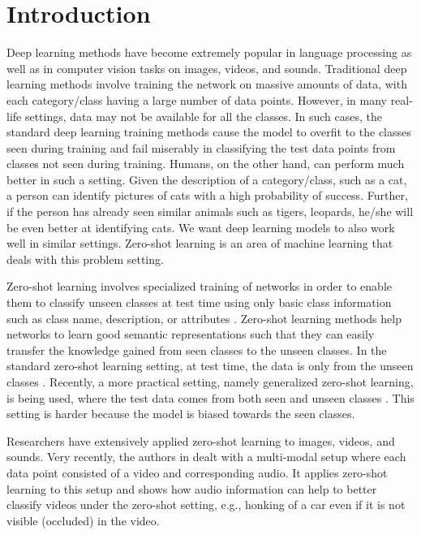 \documentclass[10pt,twocolumn,letterpaper]{article}
\begin{document}
\vspace{-10pt}
\section{Introduction}
Deep learning methods have become extremely popular in language processing as well as in computer vision tasks on images, videos, and sounds. Traditional deep learning methods involve training the network on massive amounts of data, with each category/class having a large number of data points. However, in many real-life settings, data may not be available for all the classes. In such cases, the standard deep learning training methods cause the model to overfit to the classes seen during training and fail miserably in classifying the test data points from classes not seen during training. Humans, on the other hand, can perform much better in such a setting. Given the description of a category/class, such as a cat, a person can identify pictures of cats with a high probability of success. Further, if the person has already seen similar animals such as tigers, leopards, he/she will be even better at identifying cats. We want deep learning models to also work well in similar settings. Zero-shot learning is an area of machine learning that deals with this problem setting. 

Zero-shot learning involves specialized training of networks in order to enable them to classify unseen classes at test time using only basic class information such as class name, description, or attributes \cite{frome2013devise, norouzi2013zero, xian2018feature}. Zero-shot learning methods help networks to learn good semantic representations such that they can easily transfer the knowledge gained from seen classes to the unseen classes. In the standard zero-shot learning setting, at test time, the data is only from the unseen classes \cite{lampert2013attribute}. Recently, a more practical setting, namely generalized zero-shot learning, is being used, where the test data comes from both seen and unseen classes \cite{kumar2018generalized}. This setting is harder because the model is biased towards the seen classes.

Researchers have extensively applied zero-shot learning to images, videos, and sounds. Very recently, the authors in \cite{parida2020coordinated} dealt with a multi-modal setup where each data point consisted of a video and corresponding audio. It applies zero-shot learning to this setup and shows how audio information can help to better classify videos under the zero-shot setting, e.g., honking of a car even if it is not visible (occluded) in the video. 
\end{document}
